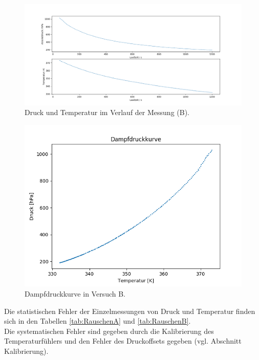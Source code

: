 \documentclass[12pt,a4paper]{article}
\begin{document}
\begin{figure}[H]
\begin{center}
\includegraphics[scale=0.4]{Bilder/Rohdaten_HauptmessungB}
\caption[Rohdaten B]{Druck und Temperatur im Verlauf der Messung (B).}
\label{fig:RohdatenB}
\end{center}
\end{figure}

\begin{figure}[H]
\begin{center}
\includegraphics[scale=0.8]{Bilder/DampfdruckkurveB}
\caption[Dampfdruckkurve B]{Dampfdruckkurve in Versuch B.}
\label{fig:DampfB}
\end{center}
\end{figure}


Die statistischen Fehler der Einzelmessungen von Druck und Temperatur finden sich in den Tabellen \ref{tab:RauschenA} und \ref{tab:RauschenB}.\\
Die systematischen Fehler sind gegeben durch die Kalibrierung des Temperaturfühlers und den Fehler des Druckoffsets gegeben (vgl. Abschnitt Kalibrierung).
\end{document}
